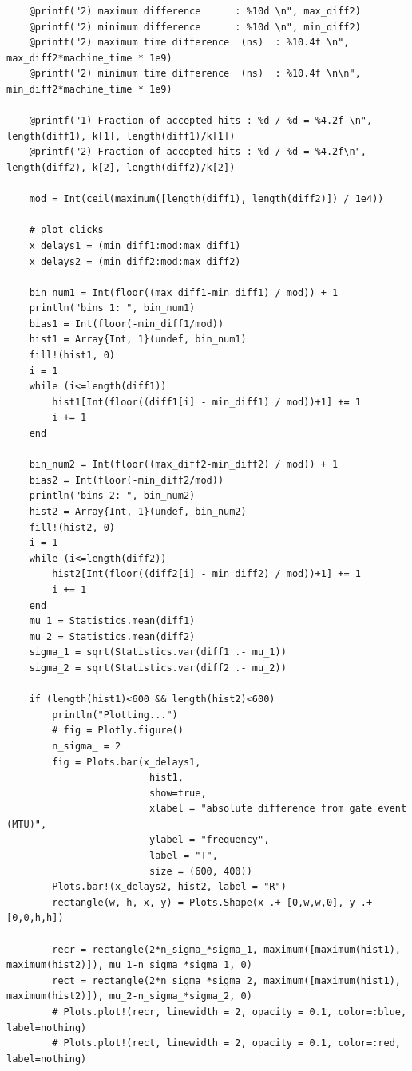 \documentclass[10pt, final]{article}
\begin{document}
\begin{mdframed}
\begin{lstlisting}
    @printf("2) maximum difference      : %10d \n", max_diff2)
    @printf("2) minimum difference      : %10d \n", min_diff2)
    @printf("2) maximum time difference  (ns)  : %10.4f \n", max_diff2*machine_time * 1e9)
    @printf("2) minimum time difference  (ns)  : %10.4f \n\n", min_diff2*machine_time * 1e9)

    @printf("1) Fraction of accepted hits : %d / %d = %4.2f \n", length(diff1), k[1], length(diff1)/k[1])
    @printf("2) Fraction of accepted hits : %d / %d = %4.2f\n", length(diff2), k[2], length(diff2)/k[2])

    mod = Int(ceil(maximum([length(diff1), length(diff2)]) / 1e4))

    # plot clicks 
    x_delays1 = (min_diff1:mod:max_diff1)
    x_delays2 = (min_diff2:mod:max_diff2)

    bin_num1 = Int(floor((max_diff1-min_diff1) / mod)) + 1
    println("bins 1: ", bin_num1)
    bias1 = Int(floor(-min_diff1/mod))
    hist1 = Array{Int, 1}(undef, bin_num1)
    fill!(hist1, 0)
    i = 1
    while (i<=length(diff1))
        hist1[Int(floor((diff1[i] - min_diff1) / mod))+1] += 1
        i += 1
    end

    bin_num2 = Int(floor((max_diff2-min_diff2) / mod)) + 1
    bias2 = Int(floor(-min_diff2/mod))
    println("bins 2: ", bin_num2)
    hist2 = Array{Int, 1}(undef, bin_num2)
    fill!(hist2, 0)
    i = 1
    while (i<=length(diff2))
        hist2[Int(floor((diff2[i] - min_diff2) / mod))+1] += 1
        i += 1
    end
    mu_1 = Statistics.mean(diff1)
    mu_2 = Statistics.mean(diff2)
    sigma_1 = sqrt(Statistics.var(diff1 .- mu_1))
    sigma_2 = sqrt(Statistics.var(diff2 .- mu_2)) 

    if (length(hist1)<600 && length(hist2)<600)
        println("Plotting...")
        # fig = Plotly.figure()
        n_sigma_ = 2
        fig = Plots.bar(x_delays1,
                         hist1,
                         show=true,
                         xlabel = "absolute difference from gate event (MTU)",
                         ylabel = "frequency", 
                         label = "T", 
                         size = (600, 400))
        Plots.bar!(x_delays2, hist2, label = "R")
        rectangle(w, h, x, y) = Plots.Shape(x .+ [0,w,w,0], y .+ [0,0,h,h])

        recr = rectangle(2*n_sigma_*sigma_1, maximum([maximum(hist1), maximum(hist2)]), mu_1-n_sigma_*sigma_1, 0)
        rect = rectangle(2*n_sigma_*sigma_2, maximum([maximum(hist1), maximum(hist2)]), mu_2-n_sigma_*sigma_2, 0)
        # Plots.plot!(recr, linewidth = 2, opacity = 0.1, color=:blue, label=nothing)
        # Plots.plot!(rect, linewidth = 2, opacity = 0.1, color=:red, label=nothing)


\end{lstlisting}
\end{mdframed}
\end{document}
